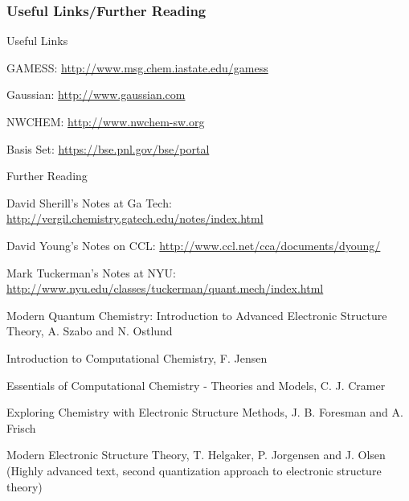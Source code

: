\documentclass[slidestop,mathserif,compress,xcolor=svgnames]{beamer}
\begin{document}
\begin{frame}
\frametitle{\small Useful Links/Further Reading}
  \vspace{-0.25cm}
  \begin{block}{Useful Links}
    \begin{itemize}
      {\tiny
      \item {\color{tigerspurple}GAMESS:} {\color{Blue}\url{http://www.msg.chem.iastate.edu/gamess}}
      \item {\color{tigerspurple}Gaussian:} {\color{Blue}\url{http://www.gaussian.com}}
      \item {\color{tigerspurple}NWCHEM:} {\color{Blue}\url{http://www.nwchem-sw.org}}
      \item {\color{tigerspurple}Basis Set:} {\color{Blue}\url{https://bse.pnl.gov/bse/portal}}
      }
    \end{itemize}
  \end{block}
  \vspace{-0.2cm}
  \begin{block}{\small Further Reading}
    \begin{itemize}
      {\tiny
      \item David Sherill's Notes at Ga Tech: {\color{Blue}\url{http://vergil.chemistry.gatech.edu/notes/index.html}}
      \item David Young's Notes on CCL: {\color{Blue}\url{http://www.ccl.net/cca/documents/dyoung/}}
      \item Mark Tuckerman's Notes at NYU: {\color{Blue}\url{http://www.nyu.edu/classes/tuckerman/quant.mech/index.html}}
      \item Modern Quantum Chemistry: Introduction to Advanced Electronic Structure Theory, A. Szabo and N. Ostlund
      \item Introduction to Computational Chemistry, F. Jensen
      \item Essentials of Computational Chemistry - Theories and Models, C. J. Cramer
      \item Exploring Chemistry with Electronic Structure Methods, J. B. Foresman and A. Frisch
      \item[$\vardiamond$]Modern Electronic Structure Theory, T. Helgaker, P. Jorgensen and J. Olsen (Highly advanced text, second quantization approach to electronic structure theory)
      }
    \end{itemize}
  \end{block}
\end{frame}
\end{document}
